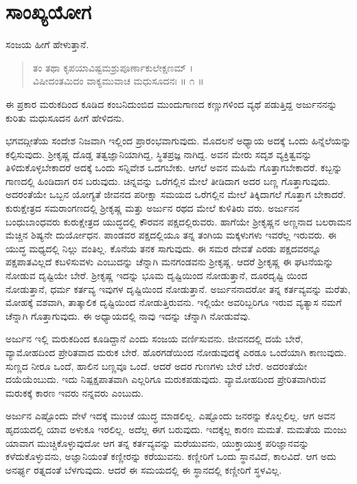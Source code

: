 
\chapter{ಸಾಂಖ್ಯಯೋಗ}

ಸಂಜಯ ಹೀಗೆ ಹೇಳುತ್ತಾನೆ.

\begin{verse}
ತಂ ತಥಾ ಕೃಪಯಾವಿಷ್ಟಮಶ್ರುಪೂರ್ಣಾಕುಲೇಕ್ಷಣಮ್ ।\\ವಿಷೀದಂತಮಿದಂ ವಾಕ್ಯಮುವಾಚ ಮಧುಸೂದನಃ \num{॥ ೧ ॥}
\end{verse}

{\small ಈ ಪ್ರಕಾರ ಮರುಕದಿಂದ ಕೂಡಿದ ಕಂಬನಿದುಂಬಿದ ಮುಂದುಗಾಣದ ಕಣ್ಣುಗಳಿಂದ ವ್ಯಥೆ ಪಡುತ್ತಿದ್ದ ಅರ್ಜುನನನ್ನು ಕುರಿತು ಮಧುಸೂದನ ಹೀಗೆ ಹೇಳಿದನು.}

ಭಗವದ್ಗೀತೆಯ ಸಂದೇಶ ನಿಜವಾಗಿ ಇಲ್ಲಿಂದ ಪ್ರಾರಂಭವಾಗುವುದು. ಮೊದಲನೆ ಅಧ್ಯಾಯ ಅದಕ್ಕೆ ಒಂದು ಹಿನ್ನೆಲೆಯನ್ನು ಕಲ್ಪಿಸುವುದು. ಶ್ರೀಕೃಷ್ಣ ದೊಡ್ಡ ತತ್ವಜ್ಞಾನಿಯಾಗಿದ್ದ, ಸ್ಥಿತಪ್ರಜ್ಞ ನಾಗಿದ್ದ. ಅವನ ಮೇರು ಸದೃಶ ವ್ಯಕ್ತಿತ್ವವನ್ನು ತಿಳಿದುಕೊಳ್ಳಬೇಕಾದರೆ ಅದಕ್ಕೆ ಒಂದು ಸನ್ನಿವೇಶ ಒದಗಬೇಕು. ಆಗಲೆ ಅವನ ಮಹಿಮೆ ಗೊತ್ತಾಗಬೇಕಾದರೆ. ಕಬ್ಬನ್ನು ಗಾಣದಲ್ಲಿ ಹಿಂಡಿದಾಗ ರಸ ಬರುವುದು. ಚಿನ್ನವನ್ನು ಒರೆಗಲ್ಲಿನ ಮೇಲೆ ತೀಡಿದಾಗ ಅದರ ಬಣ್ಣ ಗೊತ್ತಾಗುವುದು. ಅದರಂತೆಯೇ ಒಬ್ಬನ ಯೋಗ್ಯತೆ ಜೀವನದ ಪರೀಕ್ಷಾ ಸಮಯದ ಒರೆಗಲ್ಲಿನ ಮೇಲೆ ತಿಕ್ಕಿದಾಗಲೆ ಗೊತ್ತಾಗ ಬೇಕಾದರೆ. ಕುರುಕ್ಷೇತ್ರದ ಸಮರಾಂಗಣದಲ್ಲಿ ಶ್ರೀಕೃಷ್ಣ ಮತ್ತು ಅರ್ಜುನ ರಥದ ಮೇಲೆ ಕುಳಿತಿರು ವರು. ಅರ್ಜುನನ ಬಂಧುಬಾಂಧವರು ಕುರುಕ್ಷೇತ್ರದ ಯುದ್ಧದಲ್ಲಿ ಕೌರವನ ಪಕ್ಷದಲ್ಲಿರುವರು. ಹಾಗೆಯೇ ಶ್ರೀಕೃಷ್ಣನ ಅಣ್ಣನಾದ ಬಲರಾಮನ ಮೆಚ್ಚಿನ ಶಿಷ್ಯನೇ ದುರ್ಯೋಧನ. ಪಾಂಡವರ ಪಕ್ಷದಲ್ಲಿಯೂ ತನ್ನ ತಂಗಿಯ ಮಕ್ಕಳುಗಳು ಇವರೆಲ್ಲ ಇರುವರು. ಈ ಯುದ್ಧ ಮಧ್ಯದಲ್ಲಿ ನಿಲ್ಲು ವಂತಿಲ್ಲ. ಕೊನೆಯ ತನಕ ಸಾಗುವುದು. ಈ ಸಮರ ದೇವತೆ ಎರಡು ಪಕ್ಷದವರನ್ನೂ ಪಕ್ಷಪಾತವಿಲ್ಲದೆ ಕಬಳಿಸುವಳು ಎಂಬುದನ್ನು ಚೆನ್ನಾಗಿ ಮನಗಂಡವನು ಶ್ರೀಕೃಷ್ಣ. ಆದರೆ ಶ್ರೀಕೃಷ್ಣ ಈ ಘಟನೆಯನ್ನು ನೋಡುವ ದೃಷ್ಟಿಯೇ ಬೇರೆ. ಶ್ರೀಕೃಷ್ಣ ಇದನ್ನು ಭೂಮ ದೃಷ್ಟಿಯಿಂದ ನೋಡುತ್ತಾನೆ, ದೂರದೃಷ್ಟಿ ಯಿಂದ ನೋಡುತ್ತಾನೆ, ಧರ್ಮ ಕರ್ತವ್ಯ ಇವುಗಳ ದೃಷ್ಟಿಯಿಂದ ನೋಡುತ್ತಾನೆ. ಅರ್ಜುನನಾದರೋ ತನ್ನ ಕರ್ತವ್ಯವನ್ನು ಮರೆತು, ಮೋಹಕ್ಕೆ ವಶವಾಗಿ, ತಾತ್ಕಾಲಿಕ ದೃಷ್ಟಿಯಿಂದ ನೋಡುತ್ತಿರುವನು. ಇಲ್ಲಿಯೇ ಅವರಿಬ್ಬರಿಗೂ ಇರುವ ವ್ಯತ್ಯಾಸ ನಮಗೆ ಚೆನ್ನಾಗಿ ಗೊತ್ತಾಗುವುದು. ಈ ಅಧ್ಯಾಯದಲ್ಲಿ ನಾವು ಇದನ್ನು ಚೆನ್ನಾಗಿ ನೋಡುವೆವು.

ಅರ್ಜುನ ಇಲ್ಲಿ ಮರುಕದಿಂದ ಕೂಡಿದ್ದಾನೆ ಎಂದು ಸಂಜಯ ವರ್ಣಿಸುವನು. ಜೀವನದಲ್ಲಿ ದಯೆ ಬೇರೆ, ವ್ಯಾಮೋಹದಿಂದ ಪ್ರೇರಿತವಾದ ಮರುಕ ಬೇರೆ. ಹೊರಗಡೆಯಿಂದ ನೋಡುವುದಕ್ಕೆ ಎರಡೂ ಒಂದೆಯಾಗಿ ಕಾಣುವುದು. ಸುಣ್ಣದ ನೀರೂ ಒಂದೆ, ಹಾಲಿನ ಬಣ್ಣವೂ ಒಂದೆ. ಆದರೆ ಅದರ ಗುಣಗಳು ಬೇರೆ ಬೇರೆ. ಅದರಂತೆಯೇ ದಯೆಯೆಂಬುದು. ಇದು ನಿಷ್ಪಕ್ಷಪಾತವಾಗಿ ಎಲ್ಲರಿಗೂ ಮರುಕಪಡುವುದು. ವ್ಯಾಮೋಹದಿಂದ ಪ್ರೇರಿತವಾಗಿರುವ ಮರುಕಕ್ಕೆ ಕಾರಣ ಇವರು ನನ್ನವರು ಎಂಬುದು.

ಅರ್ಜುನ ಎಷ್ಟೊಂದು ವೇಳೆ ಇದಕ್ಕೆ ಮುಂಚೆ ಯುದ್ಧ ಮಾಡಲಿಲ್ಲ. ಎಷ್ಟೊಂದು ಜನರನ್ನು ಕೊಲ್ಲಲಿಲ್ಲ. ಆಗ ಅವನ ಹೃದಯದಲ್ಲಿ ಯಾವ ಅಳುಕೂ ಇರಲಿಲ್ಲ. ಅದೆಲ್ಲ ಈಗ ಬರುವುದು. ಇದಕ್ಕೆಲ್ಲ ಕಾರಣ ಮಮತೆ. ಮಮತೆಯ ಮಂಜು ಯಾವಾಗ ಮುಚ್ಚಿಕೊಳ್ಳುವುದೋ ಆಗ ತನ್ನ ಕರ್ತವ್ಯವನ್ನು ಮರೆಯುವನು, ಯುಕ್ತಾಯುಕ್ತ ಪರಿಜ್ಞಾನವನ್ನು ಕಳೆದುಕೊಳ್ಳುವನು, ಅಜ್ಞಾನಿಯಂತೆ ಕಣ್ಣೀರನ್ನು ಕರೆಯುವನು. ಕಣ್ಣೀರಿಗೆ ಒಂದು ಸ್ಥಾನವಿದೆ, ಕಾಲವಿದೆ. ಆಗ ಅದು ಅನರ್ಘ್ಯ ರತ್ನದಂತೆ ಬೆಳಗುವುದು. ಆದರೆ ಈ ಸಮಯದಲ್ಲಿ ಈ ಸ್ಥಾನದಲ್ಲಿ ಕಣ್ಣೀರಿಗೆ ಸ್ಥಳವಿಲ್ಲ.

